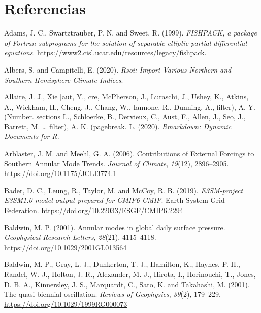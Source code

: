 \documentclass[12pt,oneside,a4paper]{reedthesis}
\newlength{\cslhangindent}
\newenvironment{CSLReferences}[2] %
 {%
  \setlength{\parindent}{0pt}
  \ifodd #1 \everypar{\setlength{\hangindent}{\cslhangindent}}\ignorespaces\fi
  \ifnum #2 > 0
  \setlength{\parskip}{#2\baselineskip}
  \fi
 }%
 {}
\begin{document}
\backmatter

\hypertarget{referencias}{%
\chapter*{Referencias}\label{referencias}}


\noindent

\setlength{\parindent}{-0.20in}

\hypertarget{refs}{}
\begin{CSLReferences}{1}{0}
\leavevmode{}%
Adams, J. C., Swartztrauber, P. N. and Sweet, R. (1999). \emph{{FISHPACK}, a package of {Fortran} subprograms for the solution of separable elliptic partial differential equations}. https://www2.cisl.ucar.edu/resources/legacy/fishpack.

\leavevmode{}%
Albers, S. and Campitelli, E. (2020). \emph{Rsoi: {Import Various Northern} and {Southern Hemisphere Climate Indices}}.

\leavevmode{}%
Allaire, J. J., Xie {[}aut, Y., cre, McPherson, J., Luraschi, J., Ushey, K., Atkins, A., Wickham, H., Cheng, J., Chang, W., Iannone, R., Dunning, A., filter), A. Y. (Number. sections L., Schloerke, B., Dervieux, C., Aust, F., Allen, J., Seo, J., Barrett, M. \ldots{} filter), A. K. (pagebreak. L. (2020). \emph{Rmarkdown: {Dynamic Documents} for {R}}.

\leavevmode{}%
Arblaster, J. M. and Meehl, G. A. (2006). Contributions of {External Forcings} to {Southern Annular Mode Trends}. \emph{Journal of Climate}, \emph{19}(12), 2896--2905. \url{https://doi.org/10.1175/JCLI3774.1}

\leavevmode{}%
Bader, D. C., Leung, R., Taylor, M. and McCoy, R. B. (2019). \emph{E3SM-project E3SM1.0 model output prepared for CMIP6 CMIP}. Earth System Grid Federation. \url{https://doi.org/10.22033/ESGF/CMIP6.2294}

\leavevmode{}%
Baldwin, M. P. (2001). Annular modes in global daily surface pressure. \emph{Geophysical Research Letters}, \emph{28}(21), 4115--4118. \url{https://doi.org/10.1029/2001GL013564}

\leavevmode{}%
Baldwin, M. P., Gray, L. J., Dunkerton, T. J., Hamilton, K., Haynes, P. H., Randel, W. J., Holton, J. R., Alexander, M. J., Hirota, I., Horinouchi, T., Jones, D. B. A., Kinnersley, J. S., Marquardt, C., Sato, K. and Takahashi, M. (2001). The quasi-biennial oscillation. \emph{Reviews of Geophysics}, \emph{39}(2), 179--229. \url{https://doi.org/10.1029/1999RG000073}


\end{CSLReferences}
\end{document}
